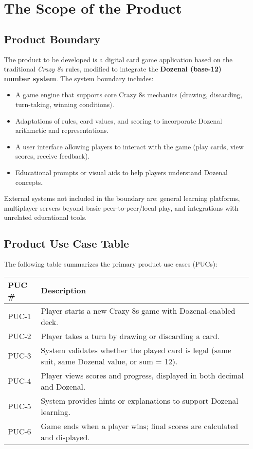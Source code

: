 \documentclass[12pt]{article}
\begin{document}
\section{The Scope of the Product}

\subsection{Product Boundary}
The product to be developed is a digital card game application based on the traditional \textit{Crazy 8s} rules, modified to integrate the \textbf{Dozenal (base-12) number system}.
The system boundary includes:
\begin{itemize}
    \item A game engine that supports core Crazy 8s mechanics (drawing, discarding, turn-taking, winning conditions).
    \item Adaptations of rules, card values, and scoring to incorporate Dozenal arithmetic and representations.
    \item A user interface allowing players to interact with the game (play cards, view scores, receive feedback).
    \item Educational prompts or visual aids to help players understand Dozenal concepts.
\end{itemize}
External systems not included in the boundary are: general learning platforms, multiplayer servers beyond basic peer-to-peer/local play, and integrations with unrelated educational tools.

\subsection{Product Use Case Table}
The following table summarizes the primary product use cases (PUCs):

\begin{tabularx}{\textwidth}{|l|X|}
    \hline
    \textbf{PUC \#} & \textbf{Description} \\
    \hline
    PUC-1 & Player starts a new Crazy 8s game with Dozenal-enabled deck. \\
    \hline
    PUC-2 & Player takes a turn by drawing or discarding a card. \\
    \hline
    PUC-3 & System validates whether the played card is legal (same suit, same Dozenal value, or sum = 12). \\
    \hline
    PUC-4 & Player views scores and progress, displayed in both decimal and Dozenal. \\
    \hline
    PUC-5 & System provides hints or explanations to support Dozenal learning. \\
    \hline
    PUC-6 & Game ends when a player wins; final scores are calculated and displayed. \\
    \hline
\end{tabularx}
\end{document}

